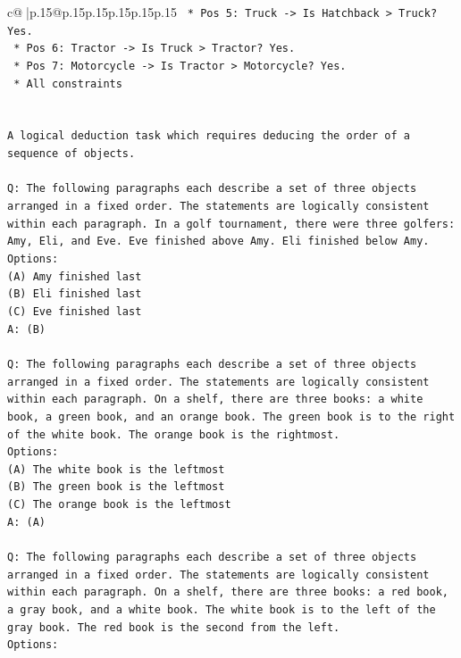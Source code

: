 \documentclass{article}
\begin{document}
{\begin{supertabular}{c@{$\;$}|p{.15\linewidth}@{}p{.15\linewidth}p{.15\linewidth}p{.15\linewidth}p{.15\linewidth}p{.15\linewidth}}
{{{\texttt{        *   Pos 5: Truck {-}> Is Hatchback > Truck? Yes.} \\
\texttt{        *   Pos 6: Tractor {-}> Is Truck > Tractor? Yes.} \\
\texttt{        *   Pos 7: Motorcycle {-}> Is Tractor > Motorcycle? Yes.} \\
\texttt{    *   All constraints} \\
\\ 
\\ 
\texttt{A logical deduction task which requires deducing the order of a sequence of objects.} \\
\\ 
\texttt{Q: The following paragraphs each describe a set of three objects arranged in a fixed order. The statements are logically consistent within each paragraph. In a golf tournament, there were three golfers: Amy, Eli, and Eve. Eve finished above Amy. Eli finished below Amy.} \\
\texttt{Options:} \\
\texttt{(A) Amy finished last} \\
\texttt{(B) Eli finished last} \\
\texttt{(C) Eve finished last} \\
\texttt{A: (B)} \\
\\ 
\texttt{Q: The following paragraphs each describe a set of three objects arranged in a fixed order. The statements are logically consistent within each paragraph. On a shelf, there are three books: a white book, a green book, and an orange book. The green book is to the right of the white book. The orange book is the rightmost.} \\
\texttt{Options:} \\
\texttt{(A) The white book is the leftmost} \\
\texttt{(B) The green book is the leftmost} \\
\texttt{(C) The orange book is the leftmost} \\
\texttt{A: (A)} \\
\\ 
\texttt{Q: The following paragraphs each describe a set of three objects arranged in a fixed order. The statements are logically consistent within each paragraph. On a shelf, there are three books: a red book, a gray book, and a white book. The white book is to the left of the gray book. The red book is the second from the left.} \\
\texttt{Options:} \\
}}}
\end{supertabular}}
\end{document}
